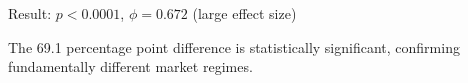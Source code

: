 \noindent Result: $p < 0.0001$, $\phi = 0.672$ (large effect size)

\vspace{0.1cm}

The 69.1 percentage point difference is statistically significant, confirming fundamentally different market regimes.

%
%
%
%

